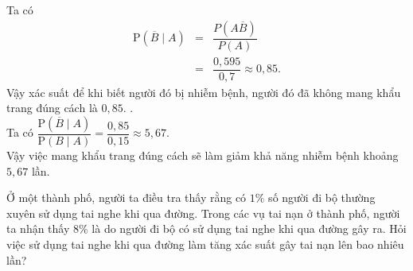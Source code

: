 \begin{ex}
{\begin{itemchoice}
		Ta có
		\allowdisplaybreaks
		\begin{eqnarray*}
			\mathrm{P}\left(\overline{B}\mid A\right)& =& \dfrac{P\left(A\overline{B}\right)}{P(A)}
			\\
			&=&\dfrac{0{,}595}{0{,}7} \approx 0{,}85.
		\end{eqnarray*}
	Vậy xác suất để khi biết người đó bị nhiễm bệnh, người đó đã không mang khẩu trang đúng cách là $0{,}85$.
		.\\
		Ta có $\dfrac{\mathrm{P}\left(\overline{B}\mid A\right)}{\mathrm{P}(B\mid A)} = \dfrac{0{,}85}{0{,}15} \approx 5{,}67 $.\\
		Vậy việc mang khẩu trang đúng cách sẽ làm giảm khả năng nhiễm bệnh khoảng $5{,}67$ lần.
	\end{itemchoice}
}
\end{ex}

\begin{ex}%
Ở một thành phố, người ta điều tra thấy rằng có \(1\%\) số người đi bộ thường xuyên sử dụng tai nghe khi qua đường. Trong các vụ tai nạn ở thành phố, người ta nhận thấy \(8\%\) là do người đi bộ có sử dụng tai nghe khi qua đường gây ra. Hỏi việc sử dụng tai nghe khi qua đường làm tăng xác suất gây tai nạn lên bao nhiêu lần?
\end{ex}

